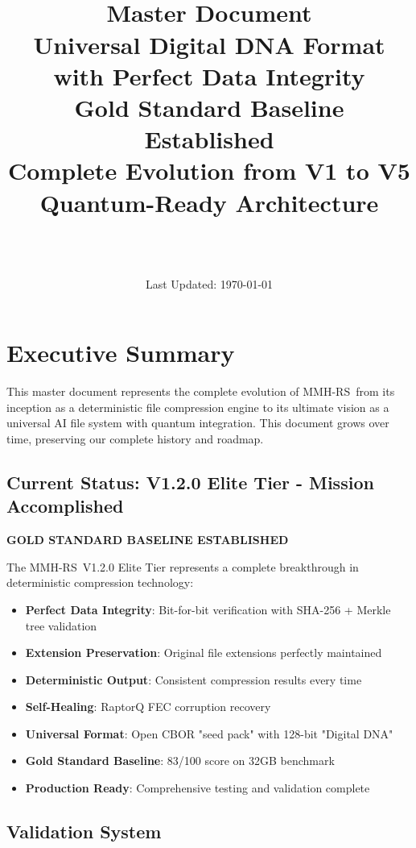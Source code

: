 \documentclass[12pt,a4paper]{article}
\title{\Huge\textbf{\project\ \version}\\[0.5cm]
\Large\textbf{Master Document}\\[0.3cm]
\large Universal Digital DNA Format with Perfect Data Integrity\\[0.5cm]
\large Gold Standard Baseline Established\\[0.3cm]
\large Complete Evolution from V1 to V5\\[0.3cm]
\large Quantum-Ready Architecture}
\author{\Large\authorname\\[0.2cm]\email\\[0.2cm]\github}
\date{\large Last Updated: \today}
\newcommand{\project}{MMH-RS}
\begin{document}
\maketitle
\thispagestyle{empty}

\tableofcontents
\newpage

\section{Executive Summary}

This master document represents the complete evolution of \project\ from its inception as a deterministic file compression engine to its ultimate vision as a universal AI file system with quantum integration. This document grows over time, preserving our complete history and roadmap.

\subsection{Current Status: V1.2.0 Elite Tier - Mission Accomplished}

\textbf{GOLD STANDARD BASELINE ESTABLISHED}

The \project\ V1.2.0 Elite Tier represents a complete breakthrough in deterministic compression technology:

\begin{itemize}
    \item \textbf{Perfect Data Integrity}: Bit-for-bit verification with SHA-256 + Merkle tree validation
    \item \textbf{Extension Preservation}: Original file extensions perfectly maintained
    \item \textbf{Deterministic Output}: Consistent compression results every time
    \item \textbf{Self-Healing}: RaptorQ FEC corruption recovery
    \item \textbf{Universal Format}: Open CBOR "seed pack" with 128-bit "Digital DNA"
    \item \textbf{Gold Standard Baseline}: 83/100 score on 32GB benchmark
    \item \textbf{Production Ready}: Comprehensive testing and validation complete
\end{itemize}

\subsection{Validation System}
\end{document}
